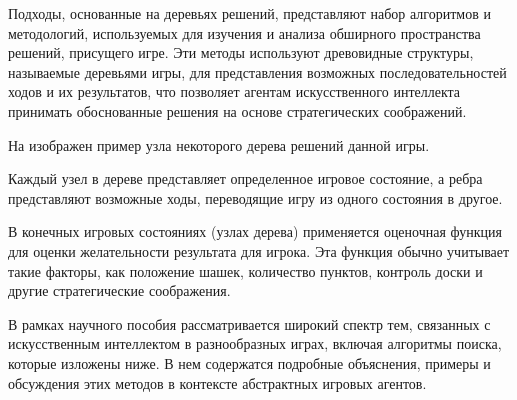 Подходы, основанные на деревьях решений, представляют набор алгоритмов и методологий, используемых для изучения и анализа обширного пространства решений, присущего игре. Эти методы используют древовидные структуры, называемые деревьями игры, для представления возможных последовательностей ходов и их результатов, что позволяет агентам искусственного интеллекта принимать обоснованные решения на основе стратегических соображений.

На  изображен пример узла некоторого дерева решений данной игры.


Каждый узел в дереве представляет определенное игровое состояние, а ребра представляют возможные ходы, переводящие игру из одного состояния в другое.

В конечных игровых состояниях (узлах дерева) применяется оценочная функция для оценки желательности результата для игрока. Эта функция обычно учитывает такие факторы, как положение шашек, количество пунктов, контроль доски и другие стратегические соображения.

В рамках научного пособия \cite{ai-modern-approach} рассматривается широкий спектр тем, связанных с искусственным интеллектом в разнообразных играх, включая алгоритмы поиска, которые изложены ниже. В нем содержатся подробные объяснения, примеры и обсуждения этих методов в контексте абстрактных игровых агентов.
